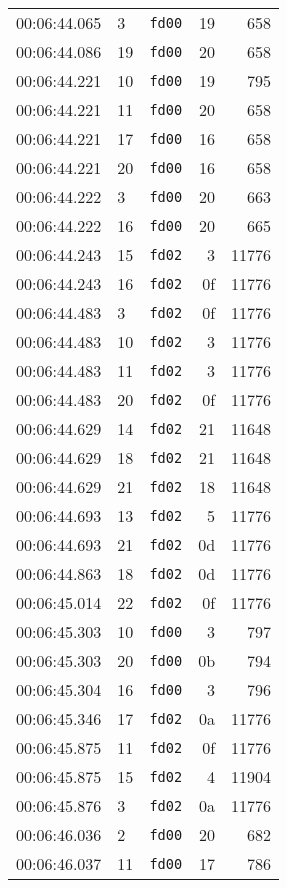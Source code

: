 \documentclass{article}
\begin{document}
\begin{longtable}{lllrr}
00:06:44.065 & 3 & \texttt{fd00} & 19 & 658 \\
00:06:44.086 & 19 & \texttt{fd00} & 20 & 658 \\
00:06:44.221 & 10 & \texttt{fd00} & 19 & 795 \\
00:06:44.221 & 11 & \texttt{fd00} & 20 & 658 \\
00:06:44.221 & 17 & \texttt{fd00} & 16 & 658 \\
00:06:44.221 & 20 & \texttt{fd00} & 16 & 658 \\
00:06:44.222 & 3 & \texttt{fd00} & 20 & 663 \\
00:06:44.222 & 16 & \texttt{fd00} & 20 & 665 \\
00:06:44.243 & 15 & \texttt{fd02} & 3 & 11776 \\
00:06:44.243 & 16 & \texttt{fd02} & 0f & 11776 \\
00:06:44.483 & 3 & \texttt{fd02} & 0f & 11776 \\
00:06:44.483 & 10 & \texttt{fd02} & 3 & 11776 \\
00:06:44.483 & 11 & \texttt{fd02} & 3 & 11776 \\
00:06:44.483 & 20 & \texttt{fd02} & 0f & 11776 \\
00:06:44.629 & 14 & \texttt{fd02} & 21 & 11648 \\
00:06:44.629 & 18 & \texttt{fd02} & 21 & 11648 \\
00:06:44.629 & 21 & \texttt{fd02} & 18 & 11648 \\
00:06:44.693 & 13 & \texttt{fd02} & 5 & 11776 \\
00:06:44.693 & 21 & \texttt{fd02} & 0d & 11776 \\
00:06:44.863 & 18 & \texttt{fd02} & 0d & 11776 \\
00:06:45.014 & 22 & \texttt{fd02} & 0f & 11776 \\
00:06:45.303 & 10 & \texttt{fd00} & 3 & 797 \\
00:06:45.303 & 20 & \texttt{fd00} & 0b & 794 \\
00:06:45.304 & 16 & \texttt{fd00} & 3 & 796 \\
00:06:45.346 & 17 & \texttt{fd02} & 0a & 11776 \\
00:06:45.875 & 11 & \texttt{fd02} & 0f & 11776 \\
00:06:45.875 & 15 & \texttt{fd02} & 4 & 11904 \\
00:06:45.876 & 3 & \texttt{fd02} & 0a & 11776 \\
00:06:46.036 & 2 & \texttt{fd00} & 20 & 682 \\
00:06:46.037 & 11 & \texttt{fd00} & 17 & 786 \\

\end{longtable}
\end{document}
